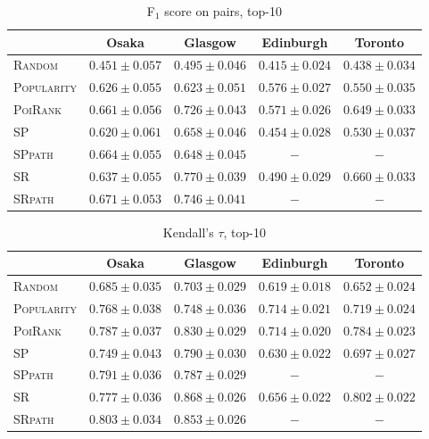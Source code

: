 \begin{table*}[t]
\caption{F$_1$ score on pairs, top-10}
\label{tab:pf1}
\centering
\begin{tabular}{l|cccc} \hline
 & Osaka & Glasgow & Edinburgh & Toronto \\ \hline
\textsc{Random} & $0.451\pm0.057$ & $0.495\pm0.046$ & $0.415\pm0.024$ & $0.438\pm0.034$ \\
\textsc{Popularity} & $0.626\pm0.055$ & $0.623\pm0.051$ & $\mathbf{0.576\pm0.027}$ & $0.550\pm0.035$ \\
\textsc{PoiRank} & $0.661\pm0.056$ & $0.726\pm0.043$ & $\mathit{0.571\pm0.026}$ & $\mathit{0.649\pm0.033}$ \\
\textsc{SP} & $0.620\pm0.061$ & $0.658\pm0.046$ & $0.454\pm0.028$ & $0.530\pm0.037$ \\
\textsc{SPpath} & $\mathit{0.664\pm0.055}$ & $0.648\pm0.045$ & $-$ & $-$ \\
\textsc{SR} & $0.637\pm0.055$ & $\mathbf{0.770\pm0.039}$ & $0.490\pm0.029$ & $\mathbf{0.660\pm0.033}$ \\
\textsc{SRpath} & $\mathbf{0.671\pm0.053}$ & $\mathit{0.746\pm0.041}$ & $-$ & $-$ \\
\hline
\end{tabular}
\end{table*}


\begin{table*}[t]
\caption{Kendall's $\tau$, top-10}
\label{tab:tau}
\centering
\begin{tabular}{l|cccc} \hline
 & Osaka & Glasgow & Edinburgh & Toronto \\ \hline
\textsc{Random} & $0.685\pm0.035$ & $0.703\pm0.029$ & $0.619\pm0.018$ & $0.652\pm0.024$ \\
\textsc{Popularity} & $0.768\pm0.038$ & $0.748\pm0.036$ & $\mathit{0.714\pm0.021}$ & $0.719\pm0.024$ \\
\textsc{PoiRank} & $0.787\pm0.037$ & $0.830\pm0.029$ & $\mathbf{0.714\pm0.020}$ & $\mathit{0.784\pm0.023}$ \\
\textsc{SP} & $0.749\pm0.043$ & $0.790\pm0.030$ & $0.630\pm0.022$ & $0.697\pm0.027$ \\
\textsc{SPpath} & $\mathit{0.791\pm0.036}$ & $0.787\pm0.029$ & $-$ & $-$ \\
\textsc{SR} & $0.777\pm0.036$ & $\mathbf{0.868\pm0.026}$ & $0.656\pm0.022$ & $\mathbf{0.802\pm0.022}$ \\
\textsc{SRpath} & $\mathbf{0.803\pm0.034}$ & $\mathit{0.853\pm0.026}$ & $-$ & $-$ \\
\hline
\end{tabular}
\end{table*}
